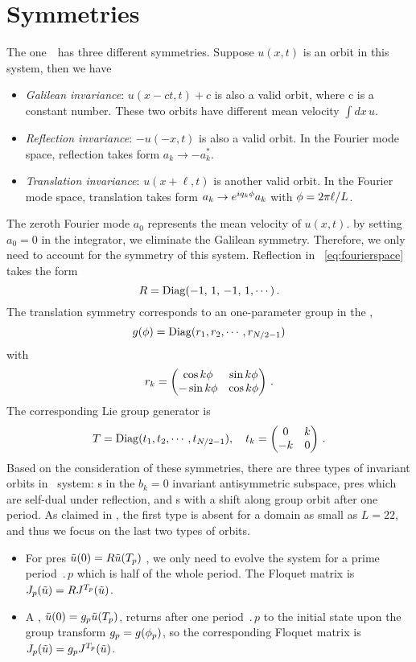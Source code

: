 \section{Symmetries}
\label{sect:kssym}

The one\dmn\ \KSe\ has three different
symmetries. Suppose $u(x, t)$ is an orbit in this system, then we have
\begin{itemize}
\item \emph{Galilean invariance}: $u(x-ct,t)+c$ is also a
  valid orbit, where c is a constant
  number. These two orbits have different mean velocity
  $\int dx\, u$.
\item \emph{Reflection invariance}:   $-u(-x,t)$ is also a valid orbit.
  In the Fourier mode space, reflection takes form $a_k \to -a_k^{*}$.
\item \emph{Translation invariance}: $u(x+\ell,t)$ is another valid orbit.
  In the Fourier mode space, translation takes form $a_k \to e^{iq_k{\bf \phi}} a_k$
  with ${\bf \phi} = 2\pi \ell/L$.
\end{itemize}
The zeroth Fourier mode $a_{0}$ represents the
mean velocity of $u(x, t)$. by setting $a_{0}=0$ in the integrator,
we eliminate the Galilean symmetry.
Therefore, we only need to account for the  symmetry of this system.
Reflection in \statesp\ \eqref{eq:fourierspace} takes the form
\[
  R=\operatorname{Diag}(-1,\, 1, \, -1, \, 1,\cdots)
  \,.
\]
The translation symmetry corresponds to an one-parameter 
group in the \statesp,
\[
  g({\bf \phi})=\operatorname{Diag}(r_{1},r_{2},\cdots,r_{N/2-1})
\]
with
\[
  r_{k}=
  \begin{pmatrix}
    \cos k{\bf \phi} & \sin k{\bf \phi} \\
    -\sin k{\bf \phi} & \cos k{\bf \phi}
  \end{pmatrix}
  \,.
\]
The corresponding Lie group generator is
\[
  T= \operatorname{Diag}(t_{1},t_{2},\cdots,t_{N/2-1}),\quad
  t_{k}=
  \begin{pmatrix}
    0 & k \\
    -k & 0
  \end{pmatrix}
  \,.
\]
Based on the consideration of these symmetries,
there are three types of invariant orbits in \KS\ system: \po s in the
$b_k=0$ invariant antisymmetric subspace, pre\po s which are self-dual
under reflection,
and \rpo s with a shift along group orbit after one
period. As claimed in , the first type is absent for a domain
as small as $L=22$, and thus we focus on the last two types of orbits.
\begin{itemize}
\item
  For pre\po s $\tilde{u}(0)=R\tilde{u}({T_{p}})$ , we only need to evolve
  the system for a prime period $\period{p}$ which is half of the whole
  period. The Floquet matrix is
  $J_{p}(\tilde{u})=RJ^{{T_{p}}}(\tilde{u})$.
\item
  A \rpo,
  $\tilde{u}(0)=g_p\tilde{u}({T_{p}})$, returns after one period
  $\period{p}$ to the initial state upon the group transform
  $g_p=g({\bf \phi}_p)$, so the corresponding Floquet matrix is
  $J_p(\tilde{u})=g_pJ^{{T_{p}}}(\tilde{u})$.
\end{itemize}
